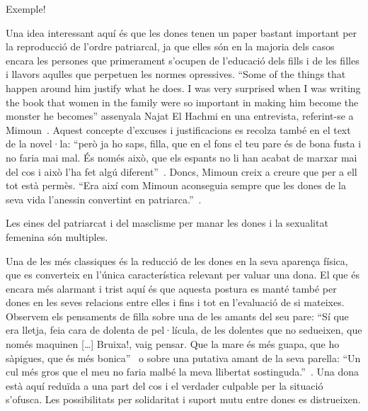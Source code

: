 Exemple!

Una idea interessant aquí és que les dones tenen un paper bastant important per la reproducció de l'ordre patriarcal, ja que elles són en la majoria dels casos encara les persones que primerament s'ocupen de l'educació dels fills i de les filles i llavors aqulles que perpetuen les normes opressives.
``Some of the things that happen around him justify what he does. I was very surprised when I was writing the book that women in the family were so important in making him become the monster he becomes'' assenyala Najat El Hachmi en una entrevista, referint-se a Mimoun~\autocite{HaAM2011}.
Aquest concepte d'excuses i justificacions es recolza també en el text de la novel·la: ``però ja ho saps, filla, que en el fons el teu pare és de bona fusta i no faria mai mal. És només això, que els espants no li han acabat de marxar mai del cos i això l'ha fet algú diferent''~\autocite[18]{ElHachmi2008}.
Doncs, Mimoun creix a creure que per a ell tot està permès.
``Era així com Mimoun aconseguia sempre que les dones de la seva vida l'anessin convertint en patriarca.''~\autocite[99]{ElHachmi2008}.

Les eines del patriarcat i del masclisme per manar les dones i la sexualitat femenina són multiples.

Una de les més classiques és la reducció de les dones en la seva aparença física, que es converteix en l'única característica relevant per valuar una dona.
El que és encara més alarmant i trist aquí és que aquesta postura es manté també per dones en les seves relacions entre elles i fins i tot en l'evaluació de si mateixes.
Observem els pensaments de filla sobre una de les amants del seu pare:
``Sí que era lletja, feia cara de dolenta de pel·lícula, de les dolentes que no sedueixen, que només maquinen [\ldots] Bruixa!, vaig pensar. Que la mare és més guapa, que ho sàpigues, que és més bonica''~\autocite[186]{ElHachmi2008}
o sobre una putativa amant de la seva parella:
``Un cul més gros que el meu no faria malbé la meva llibertat sostinguda.''~\autocite[308]{ElHachmi2008}.
Una dona està aquí reduïda a una part del cos i el verdader culpable per la situació s'ofusca.
Les possibilitats per solidaritat i suport mutu entre dones es distrueixen.

